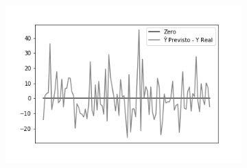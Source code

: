 \begin{figure}[hb!]
\begin{subfigure}[hb]{0.5\linewidth}
    \label{fig:redeneuralbiologica}
    \includegraphics[width=\linewidth]{img/graficos-fase2/fig-reta-0-lenet-relu-data-augmentation-21.png}%
  \end{subfigure}%
\end{figure}

